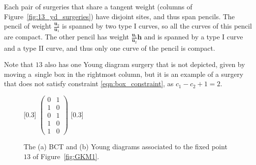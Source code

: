 \documentclass[pdftex]{sigma}
\numberwithin{equation}{section}
\newcommand{\hb}{\mathbf h}
\newcommand{\ub}{\mathbf u}
\begin{document}
Each pair of surgeries that share a tangent weight (columns of Figure~\ref{fig:13_yd_surgeries}) have disjoint sites, and thus span pencils. The pencil of weight $\frac{\ub_2}{\ub_1}$ is spanned by two type I curves, so all the curves of this pencil are compact. The other pencil has weight $\frac{\ub_1}{\ub_2} \hb$ and is spanned by a type I curve and a type II curve, and thus only one curve of the pencil is compact.

Note that $13$ also has one Young diagram surgery that is not depicted, given by moving a~single box in the rightmost column, but it is an example of a surgery that does not satisfy constraint \eqref{eqn:box_constraint}, as $c_1-c_2+1=2$.

\begin{figure}[th]
\centering
\subcaptionbox{}[0.3\textwidth]
{
$
\begin{pmatrix}
0&1\\
1&0\\
0&1\\
1&0\\
1&0
\end{pmatrix}
$
}
\subcaptionbox{}[0.3\textwidth]
{
}
\caption{The (a) BCT and (b) Young diagrams associated to the fixed point $13$ of Figure~\ref{fig:GKM1}.}
\label{fig:fixedpoint13}
\end{figure}
\end{document}
